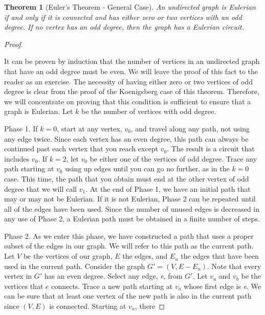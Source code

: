 \documentclass[10pt,]{book}
\theoremstyle{plain}
\newtheorem{theorem}{Theorem}[section]
\theoremstyle{definition}
\theoremstyle{definition}
\theoremstyle{definition}
\theoremstyle{definition}
\theoremstyle{definition}
\numberwithin{equation}{section}
\begin{document}
\begin{theorem}[Euler's Theorem - General Case]\label{theorem-euler-theorem-general}
An undirected graph is Eulerian if and only if it is connected and has either zero or two vertices with an odd degree. If no vertex has an odd degree, then the graph has a Eulerian circuit.%
\end{theorem}
\begin{proof}\hypertarget{proof-3}{}
It can be proven by induction that the number of vertices in an undirected graph that have an odd degree must be even. We will leave
the proof of this fact to the reader as an exercise. The necessity of having either zero or two vertices of odd degree is clear from the proof of
the Koenigsberg case of this theorem. Therefore, we will concentrate on proving that this condition is sufficient to ensure that a graph is Eulerian.
Let \(k\) be the number of vertices with odd degree.%
\par
 Phase 1. If \(k = 0\), start at any vertex, \(v_0\), and travel along any path, not using any edge twice. Since each vertex has an even
degree, this path can always be continued past each vertex that you reach except \(v_0\). The result is a circuit that includes \(v_0\). If \(k =
2\), let \(v_0\) be either one of the vertices of odd degree. Trace any path starting at \(v_0\) using up edges until you can go no further, as in
the \(k = 0\) case. This time, the path that you obtain must end at the other vertex of odd degree that we will call \(v_1\).  At the end of Phase
1, we have an initial path that may or may not be Eulerian. If it is not Eulerian, Phase 2 can be repeated until all of the edges have been used.
Since the number of unused edges is decreased in any use of Phase 2, a Eulerian path must be obtained in a finite number of steps.%
\par
 Phase 2. As we enter this phase, we have constructed a path that uses a proper subset of the edges in our graph. We will refer to this
path as the current path. Let \(V\) be the vertices of our graph, \(E\) the edges, and \(E_u\) the edges that have been used in the current
path. Consider the graph \(G' = \left(V, E - E_u\right)\).  Note that every vertex in \(G'\) has an even degree. Select any edge, \textit{
e}, from \(G'.\) Let \(v_a\) and \(v_b\) be the vertices that \(e\) connects. Trace a new path starting at \(v_a\) whose first edge is \textit{
e}. We can be sure that at least one vertex of the new path is also in the current path since \((V, E)\) is connected. Starting at \(v_a\), there

\end{proof}
\end{document}
